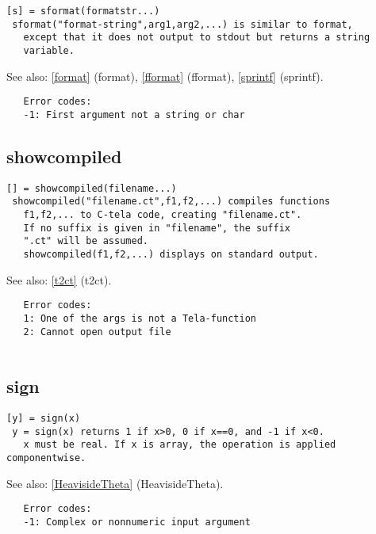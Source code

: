 \documentclass[a4paper]{article}
\begin{document}
\begin{tscreen}
\begin{verbatim}
[s] = sformat(formatstr...)
 sformat("format-string",arg1,arg2,...) is similar to format,
   except that it does not output to stdout but returns a string
   variable.
\end{verbatim}

See also: \ref{format} {(format)}, \ref{fformat} {(fformat)}, \ref{sprintf} {(sprintf)}.
\begin{verbatim}
   Error codes:
   -1: First argument not a string or char 
\end{verbatim}
\end{tscreen}





\subsection{showcompiled\label{showcompiled}}

\begin{tscreen}
\begin{verbatim}
[] = showcompiled(filename...)
 showcompiled("filename.ct",f1,f2,...) compiles functions
   f1,f2,... to C-tela code, creating "filename.ct".
   If no suffix is given in "filename", the suffix
   ".ct" will be assumed.
   showcompiled(f1,f2,...) displays on standard output.
\end{verbatim}

See also: \ref{t2ct} {(t2ct)}.
\begin{verbatim}
   Error codes:
   1: One of the args is not a Tela-function
   2: Cannot open output file
   
\end{verbatim}
\end{tscreen}





\subsection{sign\label{sign}}

\begin{tscreen}
\begin{verbatim}
[y] = sign(x)
 y = sign(x) returns 1 if x>0, 0 if x==0, and -1 if x<0.
   x must be real. If x is array, the operation is applied componentwise.
\end{verbatim}

See also: \ref{HeavisideTheta} {(HeavisideTheta)}.
\begin{verbatim}
   Error codes:
   -1: Complex or nonnumeric input argument 
\end{verbatim}
\end{tscreen}
\end{document}
